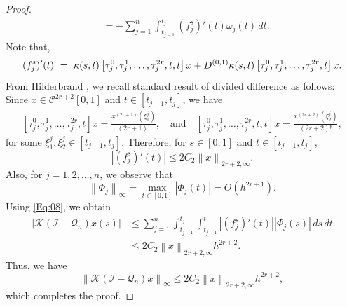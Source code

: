 \documentclass[]{interact}
\theoremstyle{plain}%
\theoremstyle{definition}
\theoremstyle{remark}
\newcommand{\norm}[1]{\left\lVert #1\right\rVert}
\begin{document}
\begin{proof}
\begin{align}
		&=-\sum_{j=1}^{n ~}\int_{t_{j-1}}^{t_j} (f_j^s)'(t) \omega_j(t) \, dt.
	\end{align}
	Note that, 	
	\begin{equation*}
		(f_j^s)'(t) ~= ~
		\kappa(s,t) \left[\tau_j^0,\tau_j^1,\ldots, \tau_j^{2r},t, t \right]x \\ 
		+ D^{(0,1)} 	\kappa(s,t) \left[\tau_j^0,\tau_j^1,\ldots, \tau_j^{2r}, t \right]x.
	\end{equation*}
	From Hilderbrand \cite{Hild}, we recall standard result of divided difference as follows:\\
	Since $x \in \mathcal{C}^{2r+2}[0,1]$ and $t \in [t_{j-1},t_j]$, we have
	\begin{align*}
		\left[\tau_j^0,\tau_j^1,\ldots, \tau_j^{2r},t \right]x = \frac{x^{(2r+1)}(\xi_1^j)}{(2r+1)!}, \quad \text{and} \quad
		\left[\tau_j^0,\tau_j^1,\ldots, \tau_j^{2r},t, t \right]x = \frac{x^{(2r+2)}(\xi_2^j)}{(2r+2)!},
	\end{align*}
	for some $\xi_1^j, \xi_2^j \in [t_{j-1},t_j]$. Therefore, for $s \in [0,1]$ and $t \in [t_{j-1},t_j]$,
	\begin{equation*}
		\left|(f_j^s)'(t) \right| \le 2 C_2 \norm{x}_{2r +2, \infty}.
	\end{equation*}
	Also, for $j=1,2,\ldots,n$, we observe that
	\begin{equation*}
		\norm{\Phi_j}_\infty = \max_{t \in [0,1]} |\Phi_j(t)| = O\left( h^{2r+1}\right).
	\end{equation*}
	Using \eqref{Eq:08}, we obtain
	\begin{align*}
		\left|\mathcal{K}(\mathcal{I} - \mathcal{Q}_n)x(s)\right| &\le \sum_{j=1}^{n} \int_{t_{j-1}}^{t_j} \int_{t_{j-1}}^t |(f_j^s)'(t)| |\Phi_j(s)| \,ds \,dt \\
		& \le 2 C_2 \norm{x}_{2r +2, \infty} h^{2r + 2}.
	\end{align*}
	Thus, we have
	\begin{equation*}
		\norm{\mathcal{K}(\mathcal{I} - \mathcal{Q}_n)x}_\infty \le 2 C_2 \norm{x}_{2r +2, \infty} h^{2r + 2},
	\end{equation*}
	which completes the proof.
\end{proof}
\end{document}
